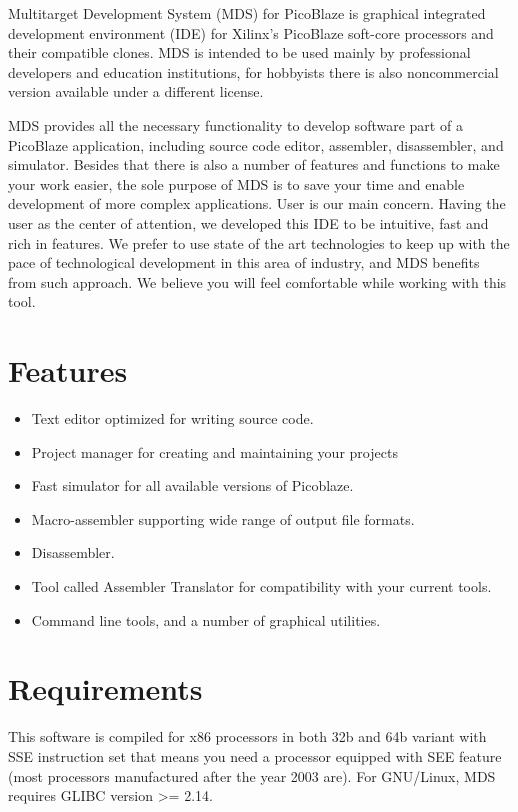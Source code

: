 Multitarget Development System (MDS) for PicoBlaze is graphical integrated development environment (IDE) for Xilinx's PicoBlaze soft-core processors and their compatible clones. MDS is intended to be used mainly by professional developers and education institutions, for hobbyists there is also noncommercial version available under a different license.

MDS provides all the necessary functionality to develop software part of a PicoBlaze application, including source code editor, assembler, disassembler, and simulator. Besides that there is also a number of features and functions to make your work easier, the sole purpose of MDS is to save your time and enable development of more complex applications. User is our main concern. Having the user as the center of attention, we developed this IDE to be intuitive, fast and rich in features. We prefer to use state of the art technologies to keep up with the pace of technological development in this area of industry, and MDS benefits from such approach. We believe you will feel comfortable while working with this tool.

\section{Features}
    \begin{itemize}
        \item Text editor optimized for writing source code.
        \item Project manager for creating and maintaining your projects
        \item Fast simulator for all available versions of Picoblaze.
        \item Macro-assembler supporting wide range of output file formats.
        \item Disassembler.
        \item Tool called Assembler Translator for compatibility with your current tools.
        \item Command line tools, and a number of graphical utilities.
    \end{itemize}

\section{Requirements}
    This software is compiled for x86 processors in both 32b and 64b variant with SSE instruction set that means you
    need a processor equipped with SEE feature (most processors manufactured after the year 2003 are). For GNU/Linux,
    MDS requires GLIBC version >= 2.14.

